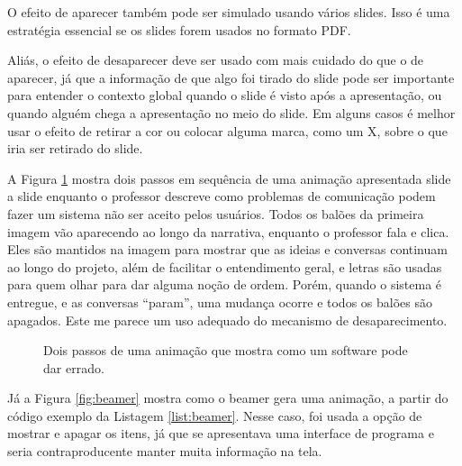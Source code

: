 O efeito de aparecer também pode ser simulado usando vários slides. Isso é uma estratégia essencial se os slides forem usados no formato PDF.


Aliás, o efeito de desaparecer deve ser usado com mais cuidado do que o de aparecer, já que a informação de que algo foi tirado do slide pode ser importante para entender o contexto global quando o slide é visto após a apresentação, ou quando alguém chega a apresentação no meio do slide. Em alguns casos é melhor usar o efeito de retirar a cor ou colocar alguma marca, como um X, sobre o que iria ser retirado do slide.

A Figura \ref{fig:passos} mostra dois passos em sequência de uma animação apresentada slide a slide enquanto o professor descreve como problemas de comunicação podem fazer um sistema não ser aceito pelos usuários. Todos os balões da primeira imagem vão aparecendo ao longo da narrativa, enquanto o professor fala e clica. Eles são mantidos na imagem para mostrar que as ideias e conversas continuam ao longo do projeto, além de facilitar o entendimento geral, e letras são usadas para quem olhar para dar alguma noção de ordem. Porém, quando o sistema é entregue, e as conversas ``param'', uma mudança ocorre e todos os balões são apagados. Este me parece um uso adequado do mecanismo de desaparecimento.

\begin{figure}[hbt]
    \centering
    \caption{Dois passos de uma animação que mostra como um software pode dar errado.}
    \label{fig:passos}
\end{figure}

Já a Figura \ref{fig:beamer} mostra como o beamer gera uma animação, a partir do código exemplo da Listagem \ref{list:beamer}. Nesse caso, foi usada a opção de mostrar e apagar os itens, já que se apresentava uma interface de programa e seria contraproducente manter muita informação na tela.

